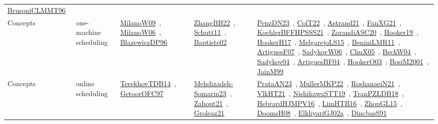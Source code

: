 {\begin{longtable}{lp{3cm}>{\raggedright\arraybackslash}p{6cm}>{\raggedright\arraybackslash}p{6cm}>{\raggedright\arraybackslash}p{8cm}}
\href{../works/BrusoniCLMMT96.pdf}{BrusoniCLMMT96}~\cite{BrusoniCLMMT96}\\
Concepts & one-machine scheduling & \href{../works/MilanoW09.pdf}{MilanoW09}~\cite{MilanoW09}, \href{../works/MilanoW06.pdf}{MilanoW06}~\cite{MilanoW06}, \href{../works/BlazewiczDP96.pdf}{BlazewiczDP96}~\cite{BlazewiczDP96} & \href{../works/ZhangBB22.pdf}{ZhangBB22}~\cite{ZhangBB22}, \href{../works/Schutt11.pdf}{Schutt11}~\cite{Schutt11}, \href{../works/Baptiste02.pdf}{Baptiste02}~\cite{Baptiste02} & \href{../works/PenzDN23.pdf}{PenzDN23}~\cite{PenzDN23}, \href{../works/ColT22.pdf}{ColT22}~\cite{ColT22}, \href{../works/Astrand21.pdf}{Astrand21}~\cite{Astrand21}, \href{../works/FanXG21.pdf}{FanXG21}~\cite{FanXG21}, \href{../works/KoehlerBFFHPSSS21.pdf}{KoehlerBFFHPSSS21}~\cite{KoehlerBFFHPSSS21}, \href{../works/ZarandiASC20.pdf}{ZarandiASC20}~\cite{ZarandiASC20}, \href{../works/Hooker19.pdf}{Hooker19}~\cite{Hooker19}, \href{../works/HookerH17.pdf}{HookerH17}~\cite{HookerH17}, \href{../works/MelgarejoLS15.pdf}{MelgarejoLS15}~\cite{MelgarejoLS15}, \href{../works/BeniniLMR11.pdf}{BeniniLMR11}~\cite{BeniniLMR11}, \href{../works/ArtiguesF07.pdf}{ArtiguesF07}~\cite{ArtiguesF07}, \href{../works/SadykovW06.pdf}{SadykovW06}~\cite{SadykovW06}, \href{../works/ChuX05.pdf}{ChuX05}~\cite{ChuX05}, \href{../works/BeckW04.pdf}{BeckW04}~\cite{BeckW04}, \href{../works/Sadykov04.pdf}{Sadykov04}~\cite{Sadykov04}, \href{../works/ArtiguesBF04.pdf}{ArtiguesBF04}~\cite{ArtiguesBF04}, \href{../works/HookerO03.pdf}{HookerO03}~\cite{HookerO03}, \href{../works/BosiM2001.pdf}{BosiM2001}~\cite{BosiM2001}, \href{../works/JainM99.pdf}{JainM99}~\cite{JainM99}\\
Concepts & online scheduling & \href{../works/TerekhovTDB14.pdf}{TerekhovTDB14}~\cite{TerekhovTDB14}, \href{../works/GetoorOFC97.pdf}{GetoorOFC97}~\cite{GetoorOFC97} & \href{../works/Mehdizadeh-Somarin23.pdf}{Mehdizadeh-Somarin23}~\cite{Mehdizadeh-Somarin23}, \href{../works/Zahout21.pdf}{Zahout21}~\cite{Zahout21}, \href{../works/Groleaz21.pdf}{Groleaz21}~\cite{Groleaz21} & \href{../works/PrataAN23.pdf}{PrataAN23}~\cite{PrataAN23}, \href{../works/MullerMKP22.pdf}{MullerMKP22}~\cite{MullerMKP22}, \href{../works/RoshanaeiN21.pdf}{RoshanaeiN21}~\cite{RoshanaeiN21}, \href{../works/VlkHT21.pdf}{VlkHT21}~\cite{VlkHT21}, \href{../works/NishikawaSTT19.pdf}{NishikawaSTT19}~\cite{NishikawaSTT19}, \href{../works/TranPZLDB18.pdf}{TranPZLDB18}~\cite{TranPZLDB18}, \href{../works/HebrardHJMPV16.pdf}{HebrardHJMPV16}~\cite{HebrardHJMPV16}, \href{../works/LimHTB16.pdf}{LimHTB16}~\cite{LimHTB16}, \href{../works/ZhouGL15.pdf}{ZhouGL15}~\cite{ZhouGL15}, \href{../works/DoomsH08.pdf}{DoomsH08}~\cite{DoomsH08}, \href{../works/ElkhyariGJ02a.pdf}{ElkhyariGJ02a}~\cite{ElkhyariGJ02a}, \href{../works/DincbasS91.pdf}{DincbasS91}~\cite{DincbasS91}\\

\end{longtable}}
